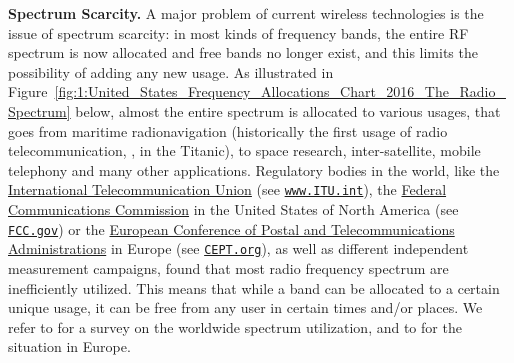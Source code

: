 \textbf{Spectrum Scarcity.}
%
A major problem of current wireless technologies is the issue of spectrum scarcity:
in most kinds of frequency bands, the entire RF spectrum is now allocated and free bands no longer exist, and this limits the possibility of adding any new usage.
As illustrated in Figure~\ref{fig:1:United_States_Frequency_Allocations_Chart_2016_The_Radio_Spectrum} below,
almost the entire spectrum
is allocated to various usages, that goes from maritime radionavigation (historically the first usage of radio telecommunication, \eg, in the Titanic), to space research, inter-satellite, mobile telephony and many other applications.
%
Regulatory bodies in the world, like the
\href{https://www.itu.int/en/Pages/default.aspx}{International Telecommunication Union} (see \href{https://www.itu.int/}{\texttt{www.ITU.int}}),
the \href{https://www.fcc.gov/}{Federal Communications Commission} in the United States of North America (see \href{https://www.fcc.gov/}{\texttt{FCC.gov}})
or the \href{https://cept.org}{European Conference of Postal and Telecommunications Administrations} in Europe (see \href{https://www.CEPT.org/}{\texttt{CEPT.org}}),
as well as different independent measurement campaigns, found that most radio frequency spectrum are inefficiently utilized.
This means that while a band can be allocated to a certain unique usage, it can be free from any user in certain times and/or places.
We refer to \cite{patil2011survey} for a survey on the worldwide spectrum utilization, and to \cite{valenta2010survey} for the situation in Europe.


